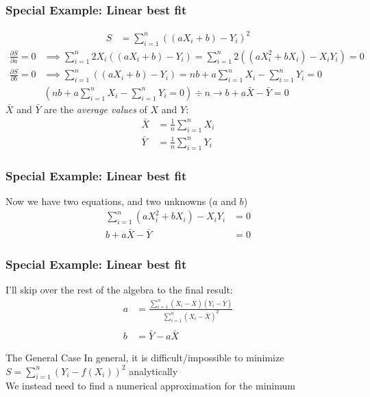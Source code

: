 \documentclass{beamer}
\begin{document}
\begin{frame}
	\frametitle{Special Example: Linear best fit}
	\begin{align*}
		S &= \sum_{i=1}^{n}\left((aX_i+b)-Y_i\right)^2
	\end{align*}
	\small
	\begin{align*}
		\frac{\partial S}{\partial a}=0&\implies \sum_{i=1}^{n}2X_i\left((aX_i+b)-Y_i\right)=\sum_{i=1}^{n}2\left((aX_i^2+bX_i)-X_iY_i\right)=0\\
		\frac{\partial S}{\partial b}=0&\implies \sum_{i=1}^{n}\left((aX_i+b)-Y_i\right)=nb+a\sum_{i=1}^{n}X_i-\sum_{i=1}^{n}Y_i=0\\
		&\left(nb+a\sum_{i=1}^{n}X_i-\sum_{i=1}^{n}Y_i=0\right)\div n\rightarrow b+a\bar{X}-\bar{Y}=0
	\end{align*}
	$\bar{X}$ and $\bar{Y}$ are the \textit{average values} of $X$ and $Y$:
	\begin{align*}
		\bar{X}&=\frac{1}{n}\sum_{i=1}^{n}X_i\\
		\bar{Y}&=\frac{1}{n}\sum_{i=1}^{n}Y_i
	\end{align*}
\end{frame}
\begin{frame}
	\frametitle{Special Example: Linear best fit}
	Now we have two equations, and two unknowns ($a$ and $b$) 
	\begin{align}
		\sum_{i=1}^{n}(aX_i^2+bX_i)-X_iY_i&=0\\
		b+a\bar{X}-\bar{Y}&=0
	\end{align}
\end{frame}


\begin{frame}
	\frametitle{Special Example: Linear best fit}
	I'll skip over the rest of the algebra to the final result:
	\begin{align*}
		a&=\frac{\sum_{i=1}^{n}\left(X_i-\bar{X}\right)\left(Y_i-\bar{Y}\right)}{\sum_{i=1}^{n}\left(X_i-\bar{X}\right)^2}\\ \\
		b&=\bar{Y}-a\bar{X}
	\end{align*}
\end{frame}





\begin{frame}{The General Case}
	In general, it is difficult/impossible to minimize $S=\sum_{i=1}^{n}\left(Y_i-f(X_i)\right)^2$ analytically\\ \vspace{1cm}
	We instead need to find a numerical approximation for the minimum
\end{frame}
\end{document}
